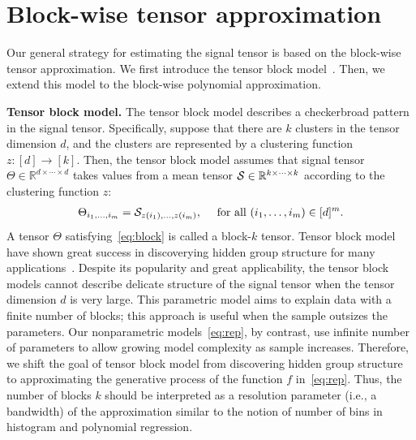 \documentclass{article}
\theoremstyle{definition}
\begin{document}
\section{Block-wise tensor approximation }\label{sec:tba}
\vspace{-.3cm}
Our general strategy for estimating the signal tensor is based on the block-wise tensor approximation. We first introduce the tensor block model~\citep{wang2019multiway,han2020exact}. Then, we extend this model to the block-wise polynomial approximation.


{\bf Tensor block model.} The tensor block model describes a checkerbroad pattern in the signal tensor. Specifically, suppose that there are $k$ clusters in the tensor dimension $d$, and the clusters are represented by a clustering function $z\colon [d]\rightarrow  [k]$. Then, the tensor block model assumes that signal tensor $\Theta\in\mathbb{R}^{d\times \cdots \times d}$ takes values from a mean tensor $\mathcal{S}\in\mathbb{R}^{k\times\cdots\times k}$ according to the clustering function $z$:
\begin{align}\label{eq:block}
    \Theta_{i_1,\ldots,i_m} = \mathcal{S}_{z(i_1),\ldots,z(i_m)}, \quad \text{ for all } (i_1,\ldots,i_m)\in[d]^m.
\end{align}
A tensor $\Theta$ satisfying~\eqref{eq:block} is called a block-$k$ tensor. Tensor block model have shown great success in discoverying hidden group structure for many applications~\citep{wang2019multiway,han2020exact}.
Despite its popularity and great applicability, the tensor block models cannot describe delicate structure of the signal tensor when the tensor dimension $d$ is very large. 
This parametric model aims to explain data with a finite number of blocks; this approach is useful when the sample outsizes the parameters. Our nonparametric models~\eqref{eq:rep}, by contrast, use infinite number of parameters to allow growing model complexity as sample increases. 
Therefore, we shift the goal of tensor block model from discovering hidden group structure to approximating the generative process of the function $f$ in~\eqref{eq:rep}. Thus, the number of blocks $k$ should be interpreted as a resolution parameter (i.e., a bandwidth) of the approximation similar to the notion of number of bins in histogram and polynomial regression. 
\end{document}
